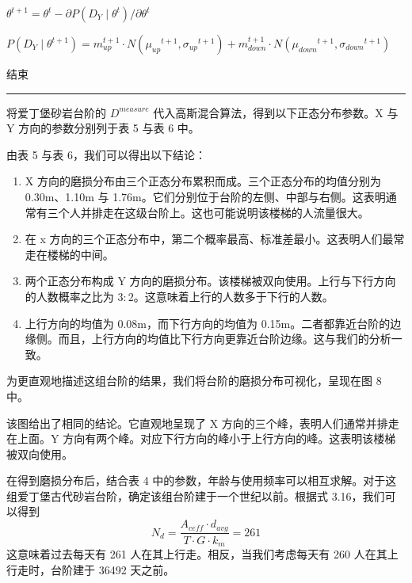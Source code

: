 \documentclass[11pt,a4paper]{ctexart}
\begin{document}
\begin{minipage}{\linewidth}
\hspace*{2.8em}\(\theta^{t+1}=\theta^{t}-\partial P(D_Y\mid\theta^{t})/\partial\theta^{t}\)\par\vspace{2pt}
\hspace*{2.8em}\(P(D_Y\mid\theta^{t+1})=m_{up}^{t+1}\cdot N(\mu_{up}{}^{t+1},\sigma_{up}{}^{t+1})+m_{down}^{t+1}\cdot N(\mu_{down}{}^{t+1},\sigma_{down}{}^{t+1})\)\par\vspace{2pt}
\hspace*{1.4em}结束\par\vspace{3pt}
\noindent\rule{\linewidth}{0.3pt}\par
\end{minipage}\par

\vspace{4pt}
将爱丁堡砂岩台阶的 \(D^{measure}\) 代入高斯混合算法，得到以下正态分布参数。X 与 Y 方向的参数分别列于表 5 与表 6 中。

由表 5 与表 6，我们可以得出以下结论：

\begin{enumerate}
\item X 方向的磨损分布由三个正态分布累积而成。三个正态分布的均值分别为 0.30m、1.10m 与 1.76m。它们分别位于台阶的左侧、中部与右侧。这表明通常有三个人并排走在这级台阶上。这也可能说明该楼梯的人流量很大。
\item 在 x 方向的三个正态分布中，第二个概率最高、标准差最小。这表明人们最常走在楼梯的中间。
\item 两个正态分布构成 Y 方向的磨损分布。该楼梯被双向使用。上行与下行方向的人数概率之比为 \(3:2\)。这意味着上行的人数多于下行的人数。
\item 上行方向的均值为 0.08m，而下行方向的均值为 0.15m。二者都靠近台阶的边缘侧。而且，上行方向的均值比下行方向更靠近台阶边缘。这与我们的分析一致。
\end{enumerate}

为更直观地描述这组台阶的结果，我们将台阶的磨损分布可视化，呈现在图 8 中。

该图给出了相同的结论。它直观地呈现了 X 方向的三个峰，表明人们通常并排走在上面。Y 方向有两个峰。对应下行方向的峰小于上行方向的峰。这表明该楼梯被双向使用。

在得到磨损分布后，结合表 4 中的参数，年龄与使用频率可以相互求解。对于这组爱丁堡古代砂岩台阶，确定该组台阶建于一个世纪以前。根据式 3.16，我们可以得到
\begin{equation}
N_d=\frac{A_{ceff}\cdot d_{avg}}{T\cdot G\cdot k_m}=261 \tag{3.18}
\end{equation}
这意味着过去每天有 261 人在其上行走。相反，当我们考虑每天有 260 人在其上行走时，台阶建于 36492 天之前。
\end{document}
